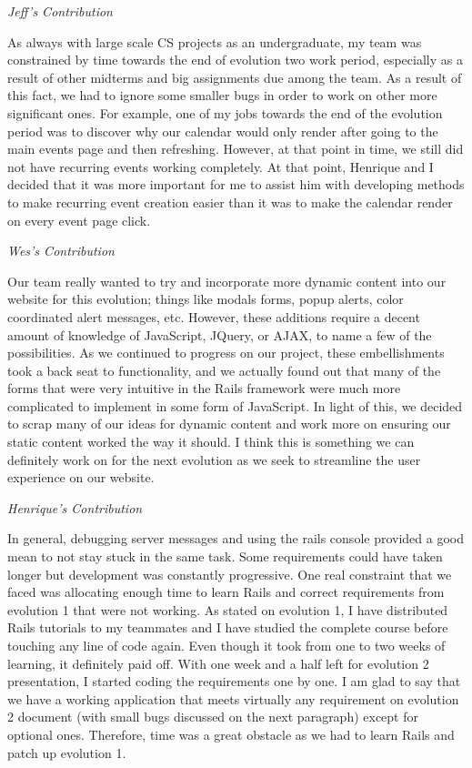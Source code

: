 \documentclass[11pt]{article}
\begin{document}
\textit{Jeff's Contribution}

As always with large scale CS projects as an undergraduate, my team was constrained by time towards the end of evolution two work period, especially as a result of other midterms and big assignments due among the team.  As a result of this fact, we had to ignore some smaller bugs in order to work on other more significant ones.  For example, one of my jobs towards the end of the evolution period was to discover why our calendar would only render after going to the main events page and then refreshing.  However, at that point in time, we still did not have recurring events working completely.  At that point, Henrique and I decided that it was more important for me to assist him with developing methods to make recurring event creation easier than it was to make the calendar render on every event page click.

\textit{Wes's Contribution}

Our team really wanted to try and incorporate more dynamic content into our website for this evolution; things like modals forms, popup alerts, color coordinated alert messages, etc.  However, these additions require a decent amount of knowledge of JavaScript, JQuery, or AJAX, to name a few of the possibilities.  As we continued to progress on our project, these embellishments took a back seat to functionality, and we actually found out that many of the forms that were very intuitive in the Rails framework were much more complicated to implement in some form of JavaScript.  In light of this, we decided to scrap many of our ideas for dynamic content and work more on ensuring our static content worked the way it should.  I think this is something we can definitely work on for the next evolution as we seek to streamline the user experience on our website. 

\textit{Henrique's Contribution}

In general, debugging server messages and using the rails console provided a good mean to not stay stuck in the same task. Some requirements could have taken longer but development was constantly progressive. One real constraint that we faced was allocating enough time to learn Rails and correct requirements from evolution 1 that were not working. As stated on evolution 1, I have distributed Rails tutorials to my teammates and I have studied the complete course before touching any line of code again. Even though it took from one to two weeks of learning, it definitely paid off. With one week and a half left for evolution 2 presentation, I started coding the requirements one by one. I am glad to say  that we have a working application that meets virtually any requirement on evolution 2 document (with small bugs discussed on the next paragraph) except for optional ones. Therefore, time was a great obstacle as we had to learn Rails and patch up evolution 1.
\end{document}
